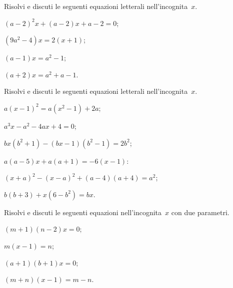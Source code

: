 \begin{esercizio}[\Ast]
\label{ese:17.43}
Risolvi e discuti le seguenti equazioni letterali nell'incognita~$x$.
\begin{multicols}{2}
\begin{enumeratea}
 \item $(a-2)^{2}x+(a-2)x+a-2=0$;
 \item $\left(9a^{2}-4\right)x=2(x+1)$;
 \item $(a-1)x=a^{2}-1$;
 \item $(a+2)x=a^{2}+a-1$.
\end{enumeratea}
\end{multicols}
\end{esercizio}

\begin{esercizio}[\Ast]
\label{ese:17.44}
Risolvi e discuti le seguenti equazioni letterali nell'incognita~$x$.
\begin{multicols}{2}
\begin{enumeratea}
\spazielenx
 \item $a(x-1)^{2}=a(x^{2}-1)+2a$;
 \item $a^{3}x-a^{2}-4ax+4=0$;
 \item $bx\left(b^{2}+1\right)-(bx-1)\left(b^{2}-1\right)=2b^{2}$;
 \item $a(a-5)x+a(a+1)=-6(x-1)$:
 \item $(x+a)^{2}-(x-a)^{2}+(a-4)(a+4)=a^{2}$;
 \item $b(b+3)+x\left(6-b^{2}\right)=bx$.
\end{enumeratea}
\end{multicols}
\end{esercizio}

\begin{esercizio}[\Ast]
\label{ese:17.45}
Risolvi e discuti le seguenti equazioni nell'incognita~$x$ con due parametri.
\begin{multicols}{2}
\begin{enumeratea}
\spazielenx
 \item $(m+1)(n-2)x=0$;
 \item $m(x-1)=n$;
 \item $(a+1)(b+1)x=0$;
 \item $(m+n)(x-1)=m-n$.
\end{enumeratea}
\end{multicols}
\end{esercizio}

